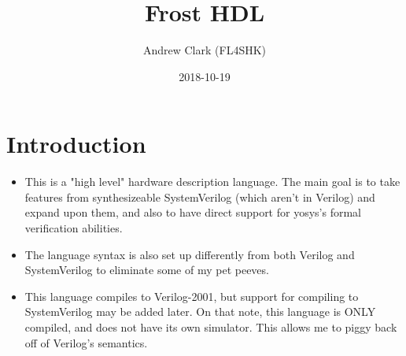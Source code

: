 \documentclass{article}
\title{Frost HDL}
\date{2018-10-19}
\author{Andrew Clark (FL4SHK)}
\begin{document}
	\maketitle
	\newpage

	\section{Introduction}
		\begin{itemize}
		\item This is a "high level" hardware description language.  The
		main goal is to take features from synthesizeable SystemVerilog
		(which aren't in Verilog) and expand upon them, and also to have
		direct support for yosys's formal verification abilities.
		\item The language syntax is also set up differently from both
		Verilog and SystemVerilog to eliminate some of my pet peeves.
		\item This language compiles to Verilog-2001, but support for
		compiling to SystemVerilog may be added later.  On that note, this
		language is ONLY compiled, and does not have its own simulator.
		This allows me to piggy back off of Verilog's semantics.
		\end{itemize}
\end{document}
